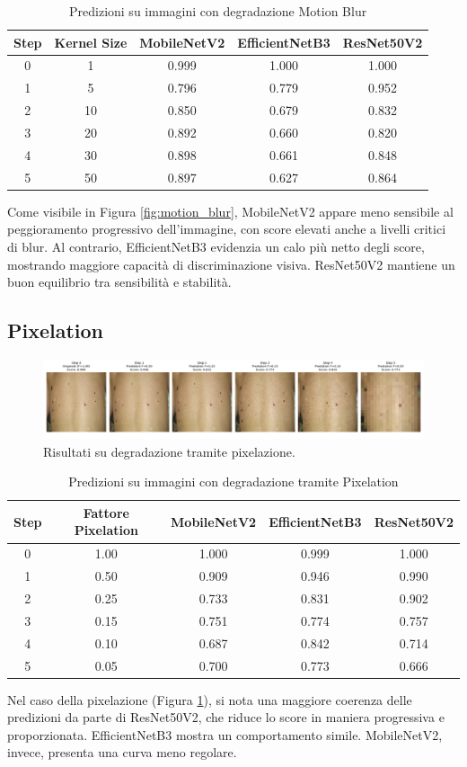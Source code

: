 \begin{table}[H]
\centering
\caption{Predizioni su immagini con degradazione Motion Blur}
\begin{tabular}{c|c|c|c|c}
\toprule
\textbf{Step} & \textbf{Kernel Size} & \textbf{MobileNetV2} & \textbf{EfficientNetB3} & \textbf{ResNet50V2} \\
\midrule
0 & 1  & 0.999 & 1.000 & 1.000 \\
1 & 5  & 0.796 & 0.779 & 0.952 \\
2 & 10 & 0.850 & 0.679 & 0.832 \\
3 & 20 & 0.892 & 0.660 & 0.820 \\
4 & 30 & 0.898 & 0.661 & 0.848 \\
5 & 50 & 0.897 & 0.627 & 0.864 \\
\bottomrule
\end{tabular}
\end{table}
Come visibile in Figura \ref{fig:motion_blur}, MobileNetV2 appare meno sensibile al peggioramento progressivo dell'immagine, con score elevati anche a livelli critici di blur. Al contrario, EfficientNetB3 evidenzia un calo più netto degli score, mostrando maggiore capacità di discriminazione visiva. ResNet50V2 mantiene un buon equilibrio tra sensibilità e stabilità.

\subsection{Pixelation}
\begin{figure}[H]
    \centering
    \includegraphics[width=\textwidth]{imgs/pixelation.png}
    \caption{Risultati su degradazione tramite pixelazione.}
    \label{fig:pixelation}
\end{figure}
\begin{table}[H]
\centering
\caption{Predizioni su immagini con degradazione tramite Pixelation}
\begin{tabular}{c|c|c|c|c}
\toprule
\textbf{Step} & \textbf{Fattore Pixelation} & \textbf{MobileNetV2} & \textbf{EfficientNetB3} & \textbf{ResNet50V2} \\
\midrule
0 & 1.00 & 1.000 & 0.999 & 1.000 \\
1 & 0.50 & 0.909 & 0.946 & 0.990 \\
2 & 0.25 & 0.733 & 0.831 & 0.902 \\
3 & 0.15 & 0.751 & 0.774 & 0.757 \\
4 & 0.10 & 0.687 & 0.842 & 0.714 \\
5 & 0.05 & 0.700 & 0.773 & 0.666 \\
\bottomrule
\end{tabular}
\end{table}
Nel caso della pixelazione (Figura \ref{fig:pixelation}), si nota una maggiore coerenza delle predizioni da parte di ResNet50V2, che riduce lo score in maniera progressiva e proporzionata. EfficientNetB3 mostra un comportamento simile. MobileNetV2, invece, presenta una curva meno regolare.

